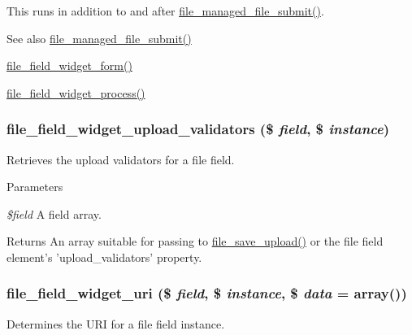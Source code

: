 This runs in addition to and after \hyperlink{file_8module_a4343cdafac927e9f8ba7156776829c71}{file\_\-managed\_\-file\_\-submit()}.

\begin{DoxySeeAlso}{See also}
\hyperlink{file_8module_a4343cdafac927e9f8ba7156776829c71}{file\_\-managed\_\-file\_\-submit()} 

\hyperlink{file_8field_8inc_a83f270ff3895b6a02c1c7cdcbffcd03f}{file\_\-field\_\-widget\_\-form()} 

\hyperlink{file_8field_8inc_a6dbe1f9dbe76cd478f57ae60409307b2}{file\_\-field\_\-widget\_\-process()} 
\end{DoxySeeAlso}
\hypertarget{file_8field_8inc_a398d58958fb8ed982650bab14fcf8408}{
\subsubsection[{file\_\-field\_\-widget\_\-upload\_\-validators}]{\setlength{\rightskip}{0pt plus 5cm}file\_\-field\_\-widget\_\-upload\_\-validators (\$ {\em field}, \/  \$ {\em instance})}}
\label{file_8field_8inc_a398d58958fb8ed982650bab14fcf8408}
Retrieves the upload validators for a file field.


\begin{DoxyParams}{Parameters}
\item[{\em \$field}]A field array.\end{DoxyParams}
\begin{DoxyReturn}{Returns}
An array suitable for passing to \hyperlink{group__file_gaec0ce0fef696b3d4f9e0809c84bd8f41}{file\_\-save\_\-upload()} or the file field element's 'upload\_\-validators' property. 
\end{DoxyReturn}
\hypertarget{file_8field_8inc_a3f46c5f930c4da9f64ea232b936c04b1}{
\subsubsection[{file\_\-field\_\-widget\_\-uri}]{\setlength{\rightskip}{0pt plus 5cm}file\_\-field\_\-widget\_\-uri (\$ {\em field}, \/  \$ {\em instance}, \/  \$ {\em data} = {\ttfamily array()})}}
\label{file_8field_8inc_a3f46c5f930c4da9f64ea232b936c04b1}
Determines the URI for a file field instance.


